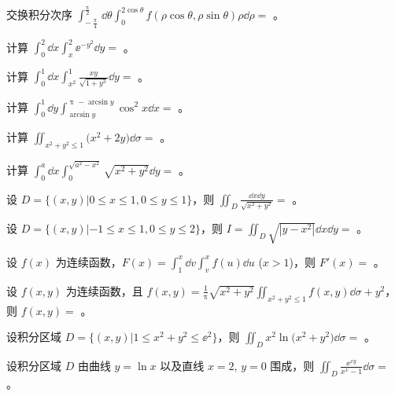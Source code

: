 \begin{ti}
	交换积分次序 $\int_{-\frac{\uppi}{4}}^{\frac{\uppi}{2}} \dd{\theta} \int_0^{2 \cos\theta} f(\rho \cos\theta,\rho \sin\theta) \rho \dd{\rho} = $ \hua。
\end{ti}

\begin{ti}
	计算 $\int_0^2 \dd{x} \int_x^2 \ee^{-y^2} \dd{y} = $ \hua。
\end{ti}

\begin{ti}
	计算 $\int_0^1 \dd{x} \int_{x^2}^1 \frac{xy}{\sqrt{1 + y^3}} \dd{y} = $ \hua。
\end{ti}

\begin{ti}
	计算 $\int_0^1 \dd{y} \int_{\arcsin y}^{\uppi - \arcsin y} \cos^2 x \dd{x} = $ \hua。
\end{ti}

\begin{ti}
	计算 $\iint_{x^2+y^2 \leq 1} \bigl( x^2 + 2y \bigr) \dd{\sigma} = $ \hua。
\end{ti}

\begin{ti}
	计算 $\int_0^a \dd{x} \int_0^{\sqrt{a^2-x^2}} \sqrt{x^2 + y^2} \dd{y} = $ \hua。
\end{ti}

\begin{ti}
	设 $D = \{ (x,y) | 0 \leq x \leq 1,0 \leq y \leq 1 \}$，则 $\iint_{D} \frac{\dd{x}\dd{y}}{\sqrt{x^2+y^2}} = $ \hua。
\end{ti}

\begin{ti}
	设 $D = \{ (x,y) | -1 \leq x \leq 1,0 \leq y \leq 2 \}$，则 $I = \iint_{D} \sqrt{|y - x^2|} \dd{x}\dd{y} = $ \hua。
\end{ti}

\begin{ti}
	设 $f(x)$ 为连续函数，$F(x) = \int_1^x \dd{v} \int_v^x f(u) \dd{u}$ ($x > 1$)，则 $F'(x) = $ \hua。
\end{ti}

\begin{ti}
	设 $f(x,y)$ 为连续函数，且 $f(x,y) = \frac{1}{\uppi} \sqrt{x^2 + y^2} \iint_{x^2+y^2 \leq 1} f(x,y) \dd{\sigma} + y^2$，则 $f(x,y) = $ \hua。
\end{ti}

\begin{ti}
	设积分区域 $D = \bigl\{ (x,y) \bigl| 1 \leq x^2+y^2 \leq \ee^2 \bigr\}$，则 $\iint_{D} x^2 \ln \bigl(x^2+y^2\bigr) \dd{\sigma} = $ \hua。
\end{ti}

\begin{ti}
	设积分区域 $D$ 由曲线 $y = \ln x$ 以及直线 $x = 2$, $y = 0$ 围成，则 $\iint_{D} \frac{\ee^{xy}}{x^x - 1} \dd{\sigma} = $ \hua。
\end{ti}